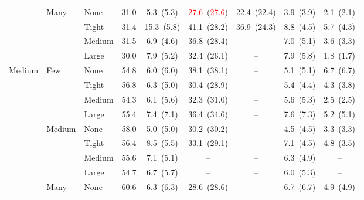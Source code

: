 \documentclass[preprint,12pt,3p]{elsarticle}
\newcommand{\red}[1]{\textcolor{red}{#1}}
\newcommand{\blue}[1]{{\color{darkblue}#1}}
\begin{document}
\begin{table}[htbp]
{\begin{tabular}{lll c ccccc}
 & \multirow{4}{*}{\small Many} & {\small None} & 31.0 & 5.3~{\scriptsize(5.3)} & \red{27.6}~{\scriptsize(\red{27.6})} & 22.4~{\scriptsize(22.4)} & 3.9~{\scriptsize(3.9)} & 2.1~{\scriptsize(2.1)} \\
 &  & {\small Tight} & 31.4 & \blue{15.3~{\scriptsize(5.8)}} & 41.1~{\scriptsize(28.2)} & 36.9~{\scriptsize(24.3)} & 8.8~{\scriptsize(4.5)} & 5.7~{\scriptsize(4.3)} \\
 &  & {\small Medium} & \blue{31.5} & \blue{6.9~{\scriptsize(4.6)}} & \blue{36.8~{\scriptsize(28.4)}} & -- & \blue{7.0~{\scriptsize(5.1)}} & \blue{3.6~{\scriptsize(3.3)}} \\
 &  & {\small Large} & \blue{30.0} & \blue{7.9~{\scriptsize(5.2)}} & \blue{32.4~{\scriptsize(26.1)}} & -- & \blue{7.9~{\scriptsize(5.8)}} & \blue{1.8~{\scriptsize(1.7)}} \\
\midrule
\multirow{12}{*}{\small Medium} & \multirow{4}{*}{\small Few} & {\small None} & 54.8 & 6.0~{\scriptsize(6.0)} & 38.1~{\scriptsize(38.1)} & -- & 5.1~{\scriptsize(5.1)} & 6.7~{\scriptsize(6.7)} \\
 &  & {\small Tight} & 56.8 & \blue{6.3~{\scriptsize(5.0)}} & 30.4~{\scriptsize(28.9)} & -- & 5.4~{\scriptsize(4.4)} & 4.3~{\scriptsize(3.8)} \\
 &  & {\small Medium} & \blue{54.3} & \blue{6.1~{\scriptsize(5.6)}} & \blue{32.3~{\scriptsize(31.0)}} & -- & \blue{5.6~{\scriptsize(5.3)}} & \blue{2.5~{\scriptsize(2.5)}} \\
 &  & {\small Large} & \blue{55.4} & \blue{7.4~{\scriptsize(7.1)}} & \blue{36.4~{\scriptsize(34.6)}} & -- & \blue{7.6~{\scriptsize(7.3)}} & \blue{5.2~{\scriptsize(5.1)}} \\
 & \multirow{4}{*}{\small Medium} & {\small None} & 58.0 & 5.0~{\scriptsize(5.0)} & 30.2~{\scriptsize(30.2)} & -- & 4.5~{\scriptsize(4.5)} & 3.3~{\scriptsize(3.3)} \\
 &  & {\small Tight} & 56.4 & \blue{8.5~{\scriptsize(5.5)}} & 33.1~{\scriptsize(29.1)} & -- & 7.1~{\scriptsize(4.5)} & 4.8~{\scriptsize(3.5)} \\
 &  & {\small Medium} & \blue{55.6} & \blue{7.1~{\scriptsize(5.1)}} & -- & -- & \blue{6.3~{\scriptsize(4.9)}} & -- \\
 &  & {\small Large} & \blue{54.7} & \blue{6.7~{\scriptsize(5.7)}} & -- & -- & \blue{6.0~{\scriptsize(5.3)}} & -- \\
 & \multirow{4}{*}{\small Many} & {\small None} & 60.6 & \blue{6.3~{\scriptsize(6.3)}} & 28.6~{\scriptsize(28.6)} & -- & 6.7~{\scriptsize(6.7)} & 4.9~{\scriptsize(4.9)} \\

\end{tabular}}
\end{table}
\end{document}
